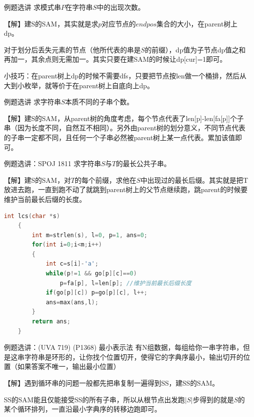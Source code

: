 \documentclass{beamer}
\begin{document}
\begin{frame}{例题选讲}
    \small
    求模式串$P$在字符串$S$中的出现次数。

    \pause \vspace{1em}
    【解】建S的SAM，其实就是求$p$对应节点的$endpos$集合的大小，在parent树上dp。

    \pause \vspace{1em}
    对于划分后丢失元素的节点（他所代表的串是$S$的前缀），dp值为子节点dp值之和再加一，其余点则无需加一。其实只要在建SAM的时候让dp[cur]=1即可。

    \pause \vspace{1em}
    小技巧：在parent树上dp的时候不需要dfs，只要把节点按len做一个桶排，然后从大到小枚举，就等价于在parent树上自底向上dp。
\end{frame}

\begin{frame}{例题选讲}
    \small
    求字符串$S$本质不同的子串个数。

    \pause \vspace{1em}
    【解】建S的SAM，从parent树的角度考虑，每个节点代表了len[p]-len[fa[p]]个子串（因为长度不同，自然互不相同）。另外由parent树的划分意义，不同节点代表的子串一定都不同，且任何一个子串必然被parent树上某一点代表。累加该值即可。
\end{frame}

\begin{frame}[fragile]{例题选讲：SPOJ 1811}
    \small
    求字符串$S$与$T$的最长公共子串。

    \pause \vspace{1em}
    【解】建S的SAM，对$T$的每个前缀，求他在$S$中出现过的最长后缀。其实就是把T放进去跑，一直到跑不动了就跳到parent树上的父节点继续跑，跳parent的时候要维护当前最长后缀的长度。

    \pause \vspace{.5em}
    \begin{lstlisting}[language=c++]
    int lcs(char *s)
    {
        int m=strlen(s), l=0, p=1, ans=0;
        for(int i=0;i<m;i++)
        {
            int c=s[i]-'a';
            while(p!=1 && go[p][c]==0)
                p=fa[p], l=len[p]; //维护当前最长后缀长度
            if(go[p][c]) p=go[p][c], l++;
            ans=max(ans,l);
        }
        return ans;
    }
    \end{lstlisting}
\end{frame}

\begin{frame}{例题选讲：(UVA 719) (P1368) 最小表示法}
    \small
    有N组数据，每组给你一串字符串，但是这串字符串是环形的，让你找个位置切开，使得它的字典序最小，输出切开的位置（如果答案不唯一，输出最小位置）

    \pause \vspace{1em}
    【解】遇到循环串的问题一般都先把串复制一遍得到SS，建SS的SAM。

    \pause \vspace{1em}
    SS的SAM能且仅能接受SS的所有子串，所以从根节点出发跑$|S|$步得到的就是$S$的某个循环排列，一直沿最小字典序的转移边跑即可。
\end{frame}
\end{document}
